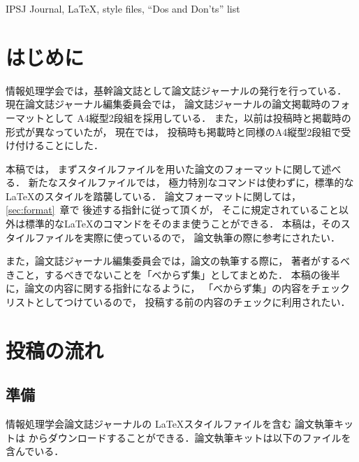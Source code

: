 \documentclass[submit]{ipsj}
\begin{document}
\begin{ekeyword}
IPSJ Journal, \LaTeX, style files, ``Dos and Don'ts'' list
\end{ekeyword}

\maketitle

\section{はじめに}
情報処理学会では，基幹論文誌として論文誌ジャーナルの発行を行っている．
現在論文誌ジャーナル編集委員会では，
論文誌ジャーナルの論文掲載時のフォーマットとして
A4縦型2段組を採用している．
また，以前は投稿時と掲載時の形式が異なっていたが，
現在では，
投稿時も掲載時と同様のA4縦型2段組で受け付けることにした．



本稿では，
まずスタイルファイルを用いた論文のフォーマットに関して述べる．
新たなスタイルファイルでは，
極力特別なコマンドは使わずに，標準的な \LaTeX のスタイルを踏襲している．
論文フォーマットに関しては，\ref{sec:format}~章で
後述する指針に従って頂くが，
そこに規定されていること以外は標準的な\LaTeX のコマンドをそのまま使うことができる．
本稿は，そのスタイルファイルを実際に使っているので，
論文執筆の際に参考にされたい．

また，論文誌ジャーナル編集委員会では，論文の執筆する際に，
著者がするべきこと，するべきでないことを「べからず集」としてまとめた．
本稿の後半に，論文の内容に関する指針になるように，
「べからず集」の内容をチェックリストとしてつけているので，
投稿する前の内容のチェックに利用されたい．




\section{投稿の流れ}


\subsection{準備}


情報処理学会論文誌ジャーナルの \LaTeX スタイルファイルを含む
論文執筆キットは
からダウンロードすることができる．論文執筆キットは以下のファイルを含んでいる．
\end{document}
